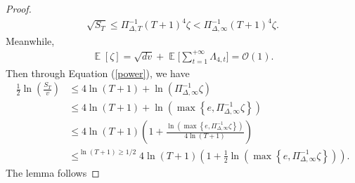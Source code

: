 \documentclass{article} %
\DeclareMathOperator{\Expect}{\mathbb{E}}
\begin{document}
\begin{proof}
\begin{align}\label{power}
\sqrt{S_{T}}\le \Pi_{\Delta,T}^{-1} (T+1)^{4}\zeta<\Pi_{\Delta,\infty}^{-1} (T+1)^{4}\zeta.
\end{align}
Meanwhile,
\begin{align}\label{bound'}\Expect[\zeta]=\sqrt{dv}+\Expect\Bigg[\sum_{t=1}^{+\infty}\Lambda_{4,t}\Bigg]=\mathcal{O}(1).\end{align}
Then through Equation (\ref{power}), we have
\begin{align*}
\frac{1}{2}\ln\left(\frac{S_{T}}{v}\right)&\le 4\ln(T+1)+\ln\left(\Pi_{\Delta,\infty}^{-1}\zeta\right)\\&\le4\ln(T+1)+\ln\left(\max\left\{e,\Pi_{\Delta,\infty}^{-1}\zeta\right\}\right)\\&\le 4\ln(T+1)\left(1+\frac{\ln\left(\max\left\{e,\Pi_{\Delta,\infty}^{-1}\zeta\right\}\right)}{4\ln(T+1)}\right)\\&\mathop{\le}^{\ln(T+1)\ge 1/2}4\ln(T+1)\left(1+\frac{1}{2}{\ln\left(\max\left\{e,\Pi_{\Delta,\infty}^{-1}\zeta\right\}\right)}\right).
\end{align*}
The lemma follows
\end{proof}
\end{document}
